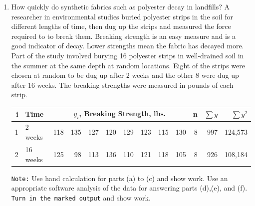 \documentclass[11pt]{article}
\begin{document}
\begin{enumerate}
\begin{enumerate}
\item Calculate a 90\% confidence interval for the difference
in population means in lead consumption between control and 
experimental groups. Assume equal variance for the two
populations. Use this interval to test the hypothesis you stated in
part (b). State the $\alpha$-level of this test and your conclusion.
\\[2in]
\item Assess the validity of the three conditions necessary for the test used in
part (b) to be valid. Give reasons for assuming that these are satisfied or not to
an acceptable degree? 
\\[1in]
\item Circle the t-statistic for testing the hypothesis you stated in Part (b) and
the p-value associated with it in your output. Extract them from your output
and write them here also.\\[1in]
\item  Extract the  90\% confidence interval for the difference in population 
means as in Part (c) from your output. Write it here and
circle it in the output.\\[1in]

\end{enumerate}
\item How quickly do synthetic fabrics such as polyester decay in landfills? A researcher in environmental studies
buried polyester strips in the soil for different lengths of time, then dug up the strips and measured the force required to to break them.  Breaking strength is an easy measure and is a good indicator of decay. Lower strengths mean the fabric has decayed more. Part of the study involved burying 16 polyester strips in well-drained soil in the summer at the same depth at random locations. Eight of the strips were chosen at random to be dug up after 2 weeks and the other 8 were dug up after 16 weeks. The breaking strengths were measured in pounds of each strip. \\[-.2in] 
\begin{center}
\begin{tabular}[8]{r|l|rrrrrrrr|rrr} \hline
i & Time & \multicolumn{8}{|c|}{$y_i$, Breaking Strength, lbs.} &n &$\sum{y}$ & $\sum{y^2}$\\ \hline
1 & 2 weeks   & 118  & 135 &  127 &  120 &  129 &  123 &  115 &  130 & 8 & 997 & 124,573 \\
2 & 16 weeks 	 & 125 & 98 &   113 &  136 &  110 &  121 &  118 &  105 & 8  & 926 & 108,184\\ \hline
\end{tabular}
\end{center}
{\tt Note:}  Use hand calculation for parts (a) to (c) and show
work. Use an appropriate software analysis of the data for answering parts (d),(e), and (f).
{\tt Turn in the marked output} and show work. 


\end{enumerate}
\end{document}
